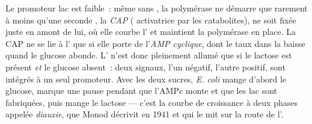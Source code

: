 \begin{definition}\label{def:b1:expression-control:cap}
Le promoteur lac est faible~: même sans , la polymérase ne
démarre que rarement à moins qu'une seconde , la \emph{CAP}
( activatrice par les catabolites), ne soit fixée juste en amont
de lui, où elle courbe l' et maintient la polymérase en place. La CAP
ne se lie à l' que si elle porte de l'\emph{AMP cyclique}, dont le
taux dans la  baisse quand le glucose abonde. L' n'est donc
pleinement allumé que si le lactose est présent \emph{et} le glucose
absent~: deux signaux, l'un négatif, l'autre positif, sont intégrés à un
seul promoteur. Avec les deux sucres, \emph{E. coli} mange d'abord le
glucose, marque une pause pendant que l'AMPc monte et que les 
lac sont fabriquées, puis mange le lactose --- c'est la courbe de
croissance à deux phases appelée \emph{diauxie}, que Monod décrivit en
1941 et qui le mit sur la route de l'.
\end{definition}

